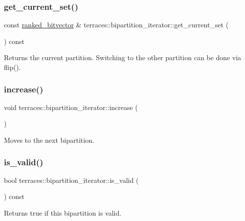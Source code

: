 \subsubsection{\texorpdfstring{get\+\_\+current\+\_\+set()}{get\_current\_set()}}
{\footnotesize\ttfamily const \hyperlink{namespaceterraces_acc45ec9c561024c50ecbce5b6738ba08}{ranked\+\_\+bitvector} \& terraces\+::bipartition\+\_\+iterator\+::get\+\_\+current\+\_\+set (\begin{DoxyParamCaption}{ }\end{DoxyParamCaption}) const}

Returns the current partition. Switching to the other partition can be done via flip(). \mbox{\label{classterraces_1_1bipartition__iterator_ac072beaef1deb4144217036e5595f4cb}} 
\subsubsection{\texorpdfstring{increase()}{increase()}}
{\footnotesize\ttfamily void terraces\+::bipartition\+\_\+iterator\+::increase (\begin{DoxyParamCaption}{ }\end{DoxyParamCaption})}

Moves to the next bipartition. \mbox{\label{classterraces_1_1bipartition__iterator_a6daf5b56669a4df0f1ed2878512c343b}} 
\subsubsection{\texorpdfstring{is\+\_\+valid()}{is\_valid()}}
{\footnotesize\ttfamily bool terraces\+::bipartition\+\_\+iterator\+::is\+\_\+valid (\begin{DoxyParamCaption}{ }\end{DoxyParamCaption}) const}

Returns true if this bipartition is valid. \mbox{\label{classterraces_1_1bipartition__iterator_ae3aa95923d3d8004050240f37aea6e65}} 
